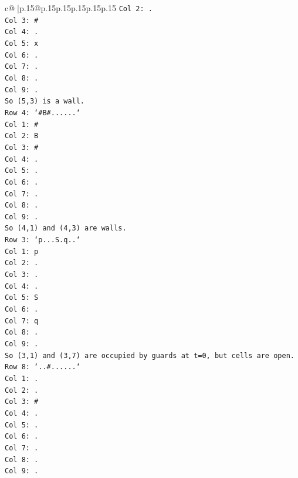 \documentclass{article}
\begin{document}
{\begin{supertabular}{c@{$\;$}|p{.15\linewidth}@{}p{.15\linewidth}p{.15\linewidth}p{.15\linewidth}p{.15\linewidth}p{.15\linewidth}}
{{{\texttt{Col 2: .} \\
\texttt{Col 3: \#} \\
\texttt{Col 4: .} \\
\texttt{Col 5: x} \\
\texttt{Col 6: .} \\
\texttt{Col 7: .} \\
\texttt{Col 8: .} \\
\texttt{Col 9: .} \\
\texttt{So (5,3) is a wall.} \\
\texttt{Row 4: `\#B\#......`} \\
\texttt{Col 1: \#} \\
\texttt{Col 2: B} \\
\texttt{Col 3: \#} \\
\texttt{Col 4: .} \\
\texttt{Col 5: .} \\
\texttt{Col 6: .} \\
\texttt{Col 7: .} \\
\texttt{Col 8: .} \\
\texttt{Col 9: .} \\
\texttt{So (4,1) and (4,3) are walls.} \\
\texttt{Row 3: `p...S.q..`} \\
\texttt{Col 1: p} \\
\texttt{Col 2: .} \\
\texttt{Col 3: .} \\
\texttt{Col 4: .} \\
\texttt{Col 5: S} \\
\texttt{Col 6: .} \\
\texttt{Col 7: q} \\
\texttt{Col 8: .} \\
\texttt{Col 9: .} \\
\texttt{So (3,1) and (3,7) are occupied by guards at t=0, but cells are open.} \\
\texttt{Row 8: `..\#......`} \\
\texttt{Col 1: .} \\
\texttt{Col 2: .} \\
\texttt{Col 3: \#} \\
\texttt{Col 4: .} \\
\texttt{Col 5: .} \\
\texttt{Col 6: .} \\
\texttt{Col 7: .} \\
\texttt{Col 8: .} \\
\texttt{Col 9: .} \\
}}}
\end{supertabular}}
\end{document}
